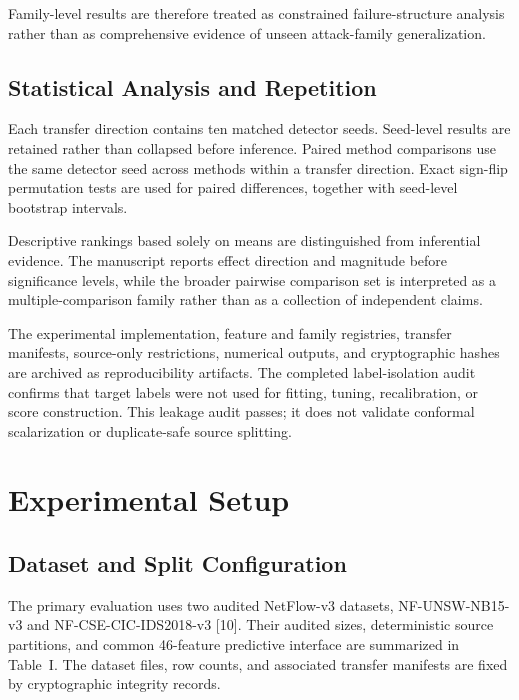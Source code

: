 \documentclass[conference]{IEEEtran}
\begin{document}
Family-level results are therefore treated as constrained failure-structure analysis rather than as comprehensive evidence of unseen attack-family generalization.

\subsection{Statistical Analysis and Repetition}

Each transfer direction contains ten matched detector seeds. Seed-level results are retained rather than collapsed before inference. Paired method comparisons use the same detector seed across methods within a transfer direction. Exact sign-flip permutation tests are used for paired differences, together with seed-level bootstrap intervals.

Descriptive rankings based solely on means are distinguished from inferential evidence. The manuscript reports effect direction and magnitude before significance levels, while the broader pairwise comparison set is interpreted as a multiple-comparison family rather than as a collection of independent claims.

The experimental implementation, feature and family registries, transfer manifests, source-only restrictions, numerical outputs, and cryptographic hashes are archived as reproducibility artifacts. The completed label-isolation audit confirms that target labels were not used for fitting, tuning, recalibration, or score construction. This leakage audit passes; it does not validate conformal scalarization or duplicate-safe source splitting.

\section{Experimental Setup}

\subsection{Dataset and Split Configuration}

The primary evaluation uses two audited NetFlow-v3 datasets, NF-UNSW-NB15-v3 and NF-CSE-CIC-IDS2018-v3 [10]. Their audited sizes, deterministic source partitions, and common 46-feature predictive interface are summarized in Table~I. The dataset files, row counts, and associated transfer manifests are fixed by cryptographic integrity records.
\end{document}
